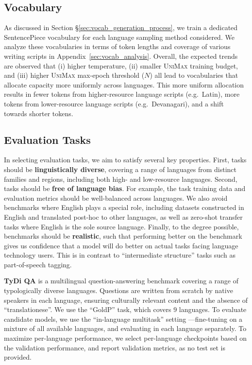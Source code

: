 \documentclass{article} %
\newcommand{\unimax}{\textsc{UniMax}}
\begin{document}
\subsection{Vocabulary}

As discussed in Section \S\ref{sec:vocab_generation_process}, we train a dedicated SentencePiece vocabulary for each language sampling method considered. We analyze these vocabularies in terms of token lengths and coverage of various writing scripts in Appendix~\ref{sec:vocab_analysis}. Overall, the expected trends are observed that (i) higher temperature, (ii) smaller \unimax{} training budget, and (iii) higher \unimax{} max-epoch threshold ($N$) all lead to vocabularies that allocate capacity more uniformly across languages. This more uniform allocation results in fewer tokens from higher-resource language scripts (e.g.~Latin), more tokens from lower-resource language scripts (e.g.~Devanagari), and a shift towards shorter tokens.

\subsection{Evaluation Tasks} \label{sec:eval_tasks}

In selecting evaluation tasks, we aim to satisfy several key properties.  First, tasks should be \textbf{linguistically diverse}, covering a range of languages from distinct families and regions, including both high- and low-resource languages.  Second, tasks should be \textbf{free of language bias}.  For example, the task training data and evaluation metrics should be well-balanced across languages.  We also avoid benchmarks where English plays a special role, including datasets constructed in English and translated post-hoc to other languages, as well as zero-shot transfer tasks where English is the sole source language.  Finally, to the degree possible, benchmarks should be \textbf{realistic}, such that performing better on the benchmark gives us confidence that a model will do better on actual tasks facing language technology users.  This is in contrast to ``intermediate structure'' tasks such as part-of-speech tagging.

\textbf{TyDi QA} \citep{clark-etal-2020-tydi} is a multilingual question-answering benchmark covering a range of typologically diverse languages. Questions are written from scratch by native speakers in each language, ensuring culturally relevant content and the absence of ``translationese''.  We use the ``GoldP'' task, which covers 9 languages.  To evaluate candidate models, we use the ``in-language multitask'' setting \citep{hu2020xtreme}---fine-tuning on a mixture of all available languages, and evaluating in each language separately.  To maximize per-language performance, we select per-language checkpoints based on the validation performance, and report validation metrics, as no test set is provided.
\end{document}
